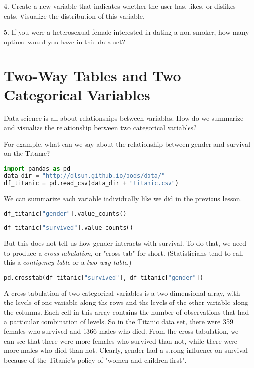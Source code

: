 4. Create a new variable that indicates whether the user has, likes, or dislikes cats. Visualize the distribution of this variable.



5. If you were a heterosexual female interested in dating a non-smoker, how many options would you have in this data set?






\section{Two-Way Tables and Two Categorical Variables}\label{2.2}



Data science is all about relationships between variables. How do we summarize and visualize the relationship between two categorical variables?

For example, what can we say about the relationship between gender and survival on the Titanic?

\begin{lstlisting}[language=Python]
import pandas as pd
data_dir = "http://dlsun.github.io/pods/data/"
df_titanic = pd.read_csv(data_dir + "titanic.csv")
\end{lstlisting}




We can summarize each variable individually like we did in the previous lesson.

\begin{lstlisting}[language=Python]
df_titanic["gender"].value_counts()
\end{lstlisting}


\begin{lstlisting}[language=Python]
df_titanic["survived"].value_counts()
\end{lstlisting}




But this does not tell us how gender interacts with survival. To do that, we need to produce a \textit{cross-tabulation}, or "cross-tab" for short. (Statisticians tend to call this a \textit{contigency table} or a \textit{two-way table}.)

\begin{lstlisting}[language=Python]
pd.crosstab(df_titanic["survived"], df_titanic["gender"])
\end{lstlisting}




A cross-tabulation of two categorical variables is a two-dimensional array, with the levels of one variable along the rows and the levels of the other variable along the columns. Each cell in this array contains the number of observations that had a particular combination of levels. So in the Titanic data set, there were 359 females who survived and 1366 males who died. From the cross-tabulation, we can see that there were more females who survived than not, while there were more males who died than not. Clearly, gender had a strong influence on survival because of the Titanic's policy of "women and children first".

